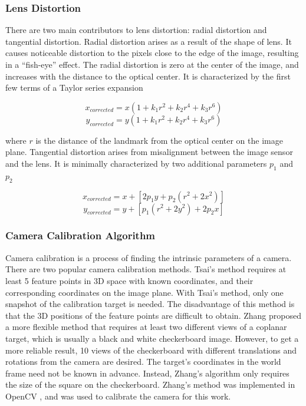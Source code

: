 \subsubsection{Lens Distortion}
There are two main contributors to lens distortion: radial distortion
and tangential distortion. Radial distortion arises as a result of the
shape of lens. It causes noticeable distortion to the pixels close to
the edge of the image, resulting in a ``fish-eye'' effect. The radial
distortion is zero at the center of the image, and increases with the
distance to the optical center. It is characterized by the first few
terms of a Taylor series expansion \cite{bradski_learning_2008}

$$ x_{corrected} = x(1+k_1r^2+k_2r^4+k_3r^6)$$
$$ y_{corrected} = y(1+k_1r^2+k_2r^4+k_3r^6)$$

\noindent where $r$ is the distance of the landmark from the optical
center on the image plane. Tangential distortion arises from
misalignment between the image sensor and the lens. It is minimally
characterized by two additional parameters $p_1$ and $p_2$
\cite{bradski_learning_2008}

$$x_{corrected} = x+[2p_1y+p_2(r^2+2x^2)]$$
$$y_{corrected} = y+[p_1(r^2+2y^2)+2p_2x]$$

\subsubsection{Camera Calibration Algorithm}
Camera calibration is a process of finding the intrinsic parameters of
a camera. There are two popular camera calibration methods. Tsai's
method \cite{tsai_efficient_1986} requires at least 5 feature points
in 3D space with known coordinates, and their corresponding
coordinates on the image plane. With Tsai's method, only one snapshot
of the calibration target is needed. The disadvantage of this method
is that the 3D positions of the feature points are difficult to
obtain. Zhang \cite{zhang_flexible_2000} proposed a more flexible
method that requires at least two different views of a coplanar
target, which is usually a black and white checkerboard image.
However, to get a more reliable result, 10 views of the checkerboard
with different translations and rotations from the camera are desired.
The target's coordinates in the world frame need not be known in
advance. Instead, Zhang's algorithm only requires the size of the
square on the checkerboard. Zhang's method was implemented in OpenCV
\cite{bradski_learning_2008}, and was used to calibrate the camera for
this work.

